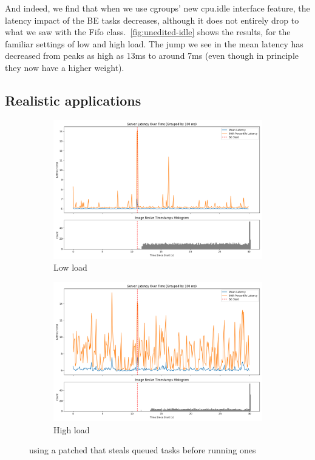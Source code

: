 And indeed, we find that when we use cgroups' new cpu.idle interface feature,
the latency impact of the BE tasks decreases, although it does not entirely drop
to what we saw with the Fifo class.\ \autoref{fig:unedited-idle} shows the
results, for the familiar settings of low and high load. The jump we see in the
mean latency has decreased from peaks as high as 13ms to around 7ms (even though
in principle they now have a higher weight).

\subsection{Realistic applications}


\begin{figure}[t]
    \centering
    \begin{subfigure}[t]{0.49\columnwidth}
        \includegraphics[width=\columnwidth]{graphs/patched-idle-low-two.png}
        \caption{Low load}\label{fig:patched-idle-low-two}
    \end{subfigure}
    \hspace{\fill}
    \begin{subfigure}[t]{0.49\columnwidth}
        \includegraphics[width=\columnwidth]{graphs/patched-idle-high-two.png}
        \caption{High load}\label{fig:patched-idle-high-two}
    \end{subfigure}
    \vspace{4pt}
    \caption{using a patched \schedidle{} that steals queued \schednormal{}
    tasks before running \schedidle{} ones}\label{fig:patched-idle}
\end{figure}


